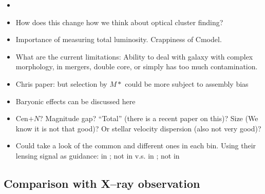 \documentclass[fleqn,usenatbib,useAMS,english]{mnras}
\begin{document}
    \begin{itemize}

        \item {}

        \item How does this change how we think about optical cluster finding?

        \item Importance of measuring total luminosity. Crappiness of Cmodel.

        \item What are the current limitations: Ability to deal with galaxy with complex
            morphology, in mergers, double core, or simply has too much contamination.


        \item Chris paper: but selection by $M*$ could be more subject to assembly bias

        \item Baryonic effects can be discussed here

        \item Cen$+N$? Magnitude gap? ``Total'' \mstar{} (there is a recent paper on this)?
            Size (We know it is not that good)? Or stellar velocity dispersion (also not very good)?

        \item Could take a look of the common and different ones in each bin. Using their
            lensing signal as guidance: in \redm{}; not in \mstar{} v.s. in \mstar{}; not in \redm{}

    \end{itemize}

\subsection{Comparison with X--ray observation}
    \label{sec:xray}

\end{document}

